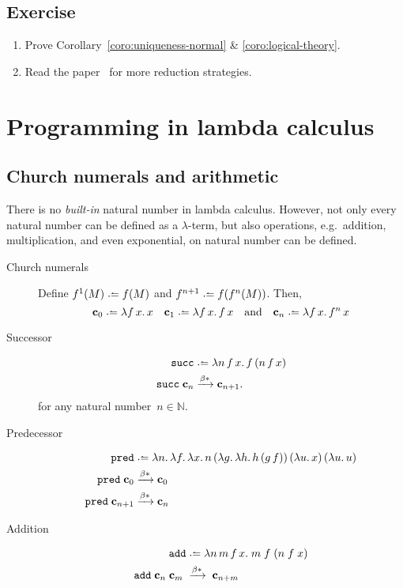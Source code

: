 \subsection*{Exercise}
\begin{enumerate}
  \item Prove
    Corollary~\ref{coro:uniqueness-normal} \& \ref{coro:logical-theory}.
  \item Read the paper~\cite[Section 7]{Sestoft2002} for more reduction
    strategies.
\end{enumerate}
\section{Programming in lambda calculus}
\subsection{Church numerals and arithmetic}
There is no \emph{built-in} natural number in lambda calculus. However, 
not only every natural number can be defined as a $\lambda$-term, but also 
operations, e.g.\ addition, multiplication, and even exponential, on natural
number can be defined. 

\begin{description}
  \item[Church numerals]
  Define $f^1(M) \defeq f(M)$ and $f^{n+1} \defeq f (f^n(M))$. Then, 
  \[
    \bc_0 \defeq \lambda f\,x.\, x
    \quad
    \bc_{1} \defeq \lambda f\,x.\, f\,x
    \quad\text{and}\quad
    \bc_{n} \defeq \lambda f\,x.\, f^{n}\,x
  \] 
  \item[Successor]
    \begin{align*}
      \mathtt{succ} &\defeq \lambda n\,f\,x.\, f\,(n\,f\,x) \\
      \mathtt{succ}\;\bc_n &\reduce \bc_{n+1}.
    \end{align*}
    for any natural number~$n \in \mathbb{N}$.
  \item[Predecessor]
    \begin{align*}
      \mathtt{pred} & \defeq \lambda n.\,\lambda f.\,\lambda x.\,n\,(\lambda
      g.\,\lambda h.\,h\,(g\,f))\,
      (\lambda u.\,x)\,(\lambda u.\,u) \\
      \mathtt{pred}\;\bc_{0}   & \reduce \bc_{0} \\
      \mathtt{pred}  \;\bc_{n+1} & \reduce \bc_{n}
    \end{align*}
  \item[Addition]
    \begin{align*}
      \mathtt{add} & \defeq \lambda n\,m\,f\,x.\; m\;f\;(n\;f\;x)  \\
      \mathtt{add}\;\bc_{n}\;\bc_{m}\;
      & \reduce\;\bc_{n + m}
    \end{align*}
\end{description}

